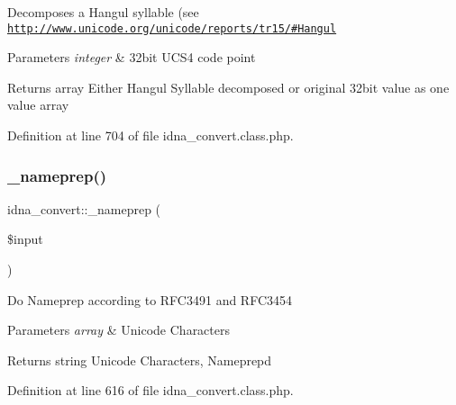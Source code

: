 Decomposes a Hangul syllable (see \href{http://www.unicode.org/unicode/reports/tr15/#Hangul}{\tt http\+://www.\+unicode.\+org/unicode/reports/tr15/\#\+Hangul} 
\begin{DoxyParams}{Parameters}
{\em integer} & 32bit U\+C\+S4 code point \\
\hline
\end{DoxyParams}
\begin{DoxyReturn}{Returns}
array Either Hangul Syllable decomposed or original 32bit value as one value array 
\end{DoxyReturn}


Definition at line 704 of file idna\+\_\+convert.\+class.\+php.

\mbox{\label{classidna__convert_ac73124acc2f1e772fadd64d176bfe0b9}} 
\subsubsection{\texorpdfstring{\+\_\+nameprep()}{\_nameprep()}}
{\footnotesize\ttfamily idna\+\_\+convert\+::\+\_\+nameprep (\begin{DoxyParamCaption}\item[{}]{\$input }\end{DoxyParamCaption})\hspace{0.3cm}{\ttfamily [protected]}}

Do Nameprep according to R\+F\+C3491 and R\+F\+C3454 
\begin{DoxyParams}{Parameters}
{\em array} & Unicode Characters \\
\hline
\end{DoxyParams}
\begin{DoxyReturn}{Returns}
string Unicode Characters, Nameprep\textquotesingle{}d 
\end{DoxyReturn}


Definition at line 616 of file idna\+\_\+convert.\+class.\+php.

\mbox{\label{classidna__convert_ac95599caba5f1a276ba1a75a12d385dd}} 
